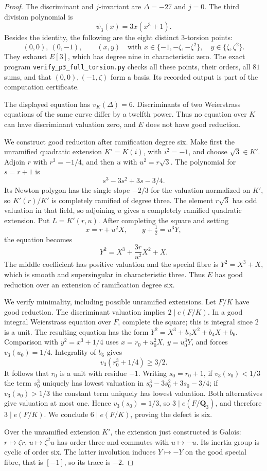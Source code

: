 \begin{proof}
The discriminant and $j$-invariant are $\Delta=-27$ and $j=0$.
The third division polynomial is
\[
 \psi_3(x)=3x(x^3+1).
\]
Besides the identity, the following are the eight distinct $3$-torsion
points:
\[
 (0,0),\ (0,-1),\qquad
 (x,y)\quad\text{with }x\in\{-1,-\zeta,-\zeta^2\},\quad
 y\in\{\zeta,\zeta^2\}.
\]
They exhaust $E[3]$, which has degree nine in characteristic zero.
The exact program \texttt{verify\_p3\_full\_torsion.py} checks all these
points, their orders, all $81$ sums, and that $(0,0),(-1,\zeta)$ form a
basis. Its recorded output is part of the computation certificate.

The displayed equation has $v_K(\Delta)=6$. Discriminants of two
Weierstrass equations of the same curve differ by a twelfth power.
Thus no equation over $K$ can have discriminant valuation zero, and
$E$ does not have good reduction.

We construct good reduction after ramification degree six. Make first
the unramified quadratic extension $K'=K(i)$, with $i^2=-1$, and choose
$\sqrt3\in K'$. Adjoin $r$ with $r^3=-1/4$, and then $u$ with
$u^2=r\sqrt3$. The polynomial for $s=r+1$ is
\[
 s^3-3s^2+3s-3/4.
\]
Its Newton polygon has the single slope $-2/3$ for the valuation
normalized on $K'$, so $K'(r)/K'$ is completely ramified of degree three.
The element $r\sqrt3$ has odd valuation in that field, so adjoining $u$
gives a completely ramified quadratic extension. Put $L=K'(r,u)$.
After completing the square and setting
\[
 x=r+u^2X,\qquad y+\tfrac12=u^3Y,
\]
the equation becomes
\[
 Y^2=X^3+\frac{3r}{u^2}X^2+X.
\]
The middle coefficient has positive valuation and the special fibre is
$Y^2=X^3+X$, which is smooth and supersingular in characteristic three.
Thus $E$ has good reduction over an extension of ramification degree six.

We verify minimality, including possible unramified extensions. Let
$F/K$ have good reduction. The discriminant valuation implies
$2\mid e(F/K)$. In a good integral Weierstrass equation over $F$, complete
the square; this is integral since $2$ is a unit. The resulting equation
has the form $Y^2=X^3+b_2X^2+b_4X+b_6$. Comparison with
$y^2=x^3+1/4$ uses $x=r_0+u_0^2X$, $y=u_0^3Y$, and forces
$v_3(u_0)=1/4$. Integrality of $b_6$ gives
\[
 v_3(r_0^3+1/4)\geq3/2.
\]
It follows that $r_0$ is a unit with residue $-1$. Writing $s_0=r_0+1$,
if $v_3(s_0)<1/3$ the term $s_0^3$ uniquely has lowest valuation in
$s_0^3-3s_0^2+3s_0-3/4$; if $v_3(s_0)>1/3$ the constant term uniquely
has lowest valuation. Both alternatives give valuation at most one.
Hence $v_3(s_0)=1/3$, so $3\mid e(F/\mathbf Q_3)$, and therefore
$3\mid e(F/K)$. We conclude $6\mid e(F/K)$, proving the defect is six.

Over the unramified extension $K'$, the extension just constructed is
Galois: $r\mapsto\zeta r$, $u\mapsto\zeta^2u$ has order three and
commutes with $u\mapsto-u$. Its inertia group is cyclic of order six.
The latter involution induces $Y\mapsto-Y$ on the good special fibre,
that is $[-1]$, so its trace is $-2$.
\end{proof}

